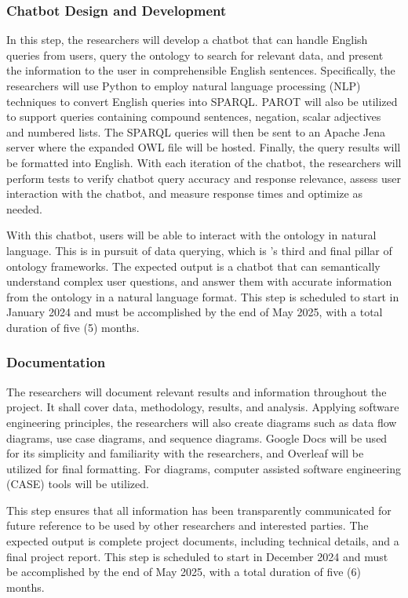 \subsubsection{Chatbot Design and Development}
In this step, the researchers will develop a chatbot that can handle English queries from users, query the ontology to search for relevant data, and present the information to the user in comprehensible English sentences. Specifically, the researchers will use Python to employ natural language processing (NLP) techniques to convert English queries into SPARQL. PAROT \cite{OCHIENG2021114712} will also be utilized to support queries containing compound sentences, negation, scalar adjectives and numbered lists. The SPARQL queries will then be sent to an Apache Jena server where the expanded OWL file will be hosted. Finally, the query results will be formatted into English. With each iteration of the chatbot, the researchers will perform tests to verify chatbot query accuracy and response relevance, assess user interaction with the chatbot, and measure response times and optimize as needed.

With this chatbot, users will be able to interact with the ontology in natural language. This is in pursuit of data querying, which is 's third and final pillar of ontology frameworks. The expected output is a chatbot that can semantically understand complex user questions, and answer them with accurate information from the ontology in a natural language format. This step is scheduled to start in January 2024 and must be accomplished by the end of May 2025, with a total duration of five (5) months.

\subsubsection{Documentation}
The researchers will document relevant results and information throughout the project. It shall cover  data, methodology, results, and analysis. Applying software engineering principles, the researchers will also create diagrams such as data flow diagrams, use case diagrams, and sequence diagrams. Google Docs will be used for its simplicity and familiarity with the researchers, and Overleaf will be utilized for final formatting. For diagrams, computer assisted software engineering (CASE) tools will be utilized.

This step ensures that all information has been transparently communicated for future reference to be used by other researchers and interested parties. The expected output is complete project documents, including technical details, and a final project report. This step is scheduled to start in December 2024 and must be accomplished by the end of May 2025, with a total duration of five (6) months.

